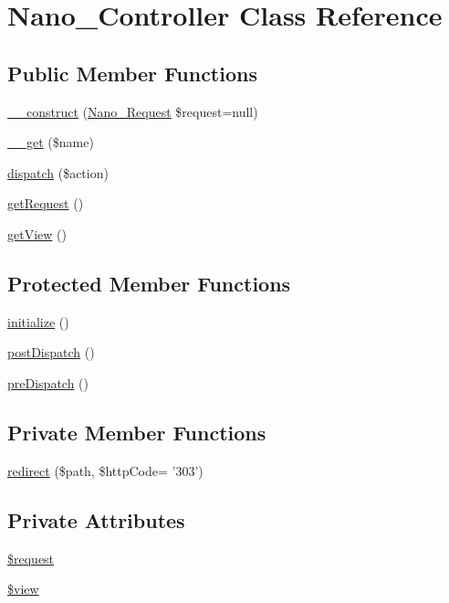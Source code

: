 \hypertarget{classNano__Controller}{
\section{Nano\_\-Controller Class Reference}
\label{classNano__Controller}
}
\subsection*{Public Member Functions}
\begin{CompactItemize}
\item 
\hyperlink{classNano__Controller_a3b272e29dad6fdec1788fe25f330f76}{\_\-\_\-construct} (\hyperlink{classNano__Request}{Nano\_\-Request} \$request=null)
\item 
\hyperlink{classNano__Controller_31302bed903d1b07b119442f50ce1840}{\_\-\_\-get} (\$name)
\item 
\hyperlink{classNano__Controller_216f1396012fe508ecebf2606f7b15df}{dispatch} (\$action)
\item 
\hyperlink{classNano__Controller_bd0bd1a7bc64c12622ad0dc00d035172}{getRequest} ()
\item 
\hyperlink{classNano__Controller_5fd98e77da342b983c5cd57a30f55137}{getView} ()
\end{CompactItemize}
\subsection*{Protected Member Functions}
\begin{CompactItemize}
\item 
\hyperlink{classNano__Controller_20aa174ec588e37efc1baab081fa2880}{initialize} ()
\item 
\hyperlink{classNano__Controller_b96aeca26d9fc00d6448c00e3d036af6}{postDispatch} ()
\item 
\hyperlink{classNano__Controller_c04ef82fec3414bbaac2d3c3e3250d56}{preDispatch} ()
\end{CompactItemize}
\subsection*{Private Member Functions}
\begin{CompactItemize}
\item 
\hyperlink{classNano__Controller_0c3e9896a90c3799ea6b0929e432a38e}{redirect} (\$path, \$httpCode= '303')
\end{CompactItemize}
\subsection*{Private Attributes}
\begin{CompactItemize}
\item 
\hyperlink{classNano__Controller_1349bb9187549c64ee682c03c39bb33a}{\$request}
\item 
\hyperlink{classNano__Controller_fe14332374580357e2e2f0621441f48b}{\$view}
\end{CompactItemize}


